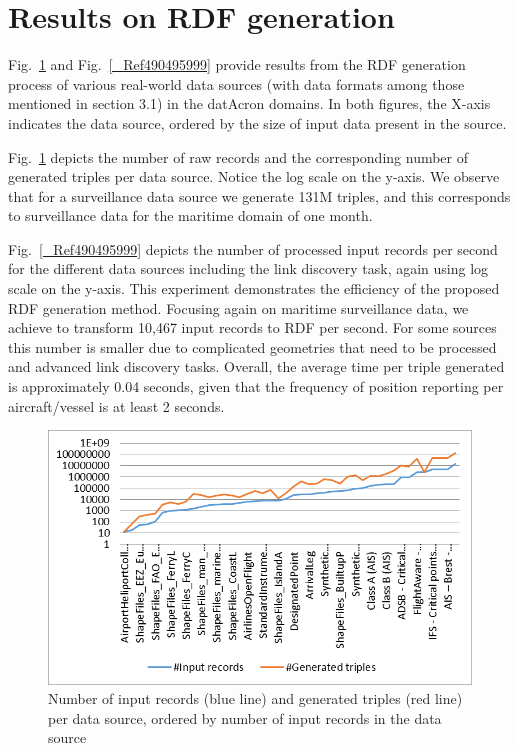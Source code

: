 \documentclass{sig-alternate}
\makeatletter
\def\maxwidth#1{\ifdim\Gin@nat@width>#1 #1\else\Gin@nat@width\fi}
\makeatother
\begin{document}
\section{Results on RDF generation}

Fig.~\ref{_Ref490495985} and Fig.~\ref{_Ref490495999} provide results from the RDF generation process of various real-world data sources (with data formats among those mentioned in section 3.1) in the datAcron domains. In both figures, the X-axis indicates the data source, ordered by the size of input data present in the source.

Fig.~\ref{_Ref490495985} depicts the number of raw records and the corresponding number of generated triples per data source. Notice the log scale on the y-axis. We observe that for a surveillance data source we generate 131M triples, and this corresponds to surveillance data for the maritime domain of one month.

Fig.~\ref{_Ref490495999} depicts the number of processed input records per second for the different data sources including the link discovery task, again using log scale on the y-axis. This experiment demonstrates the efficiency of the proposed RDF generation method. Focusing again on maritime surveillance data, we achieve to transform 10,467 input records to RDF per second. For some sources this number is smaller due to complicated geometries that need to be processed and advanced link discovery tasks. Overall, the average time per triple generated is approximately 0.04 seconds, given that the frequency of position reporting per aircraft/vessel is at least 2 seconds.
\begin{figure}[h!]
\centering
\includegraphics[width=\maxwidth{\columnwidth}]{./img/image3.png}
\cprotect\caption{  Number of input records (blue line) and generated triples (red line) per data source, ordered by number of input records in the data source}
\label{_Ref490495985}
\end{figure}
\end{document}
